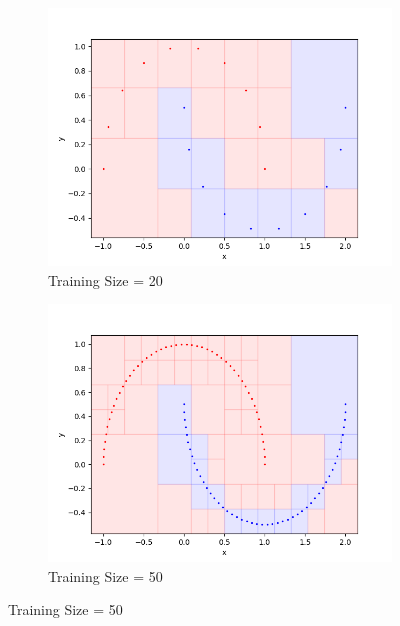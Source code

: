 \begin{figure}
\begin{subfigure}{0.45\textwidth}
\includegraphics[width=\linewidth]{visual20}
\caption{Training Size = 20} \label{fig:a}
\end{subfigure}\hspace*{\fill}
\begin{subfigure}{0.45\textwidth}
\includegraphics[width=\linewidth]{visual50}
\caption{Training Size = 50} \label{fig:b}
\end{subfigure}


\end{figure}
